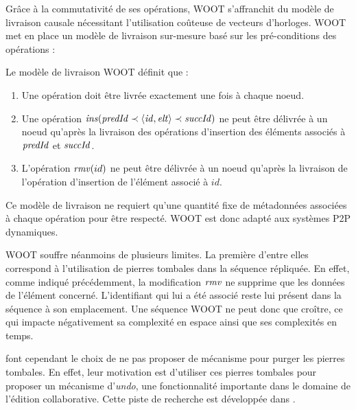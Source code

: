 Grâce à la commutativité de ses opérations, WOOT s'affranchit du modèle de livraison causale nécessitant l'utilisation coûteuse de vecteurs d'horloges.
WOOT met en place un modèle de livraison sur-mesure basé sur les pré-conditions des opérations :
\begin{definition}
  Le modèle de livraison WOOT définit que :
  \begin{enumerate}[label=(\roman*)]
    \item Une opération doit être livrée exactement une fois à chaque noeud\footnotemark.
    \item Une opération $\mathit{ins}(\mathit{predId} \prec \langle \mathit{id},\mathit{elt} \rangle \prec \mathit{succId})$ ne peut être délivrée à un noeud qu'après la livraison des opérations d'insertion des éléments associés à $\mathit{predId}$ et $\mathit{succId}$.
    \item L'opération $\mathit{rmv}(id)$ ne peut être délivrée à un noeud qu'après la livraison de l'opération d'insertion de l'élément associé à $id$.
  \end{enumerate}
\end{definition}
Ce modèle de livraison ne requiert qu'une quantité fixe de métadonnées associées à chaque opération pour être respecté.
WOOT est donc adapté aux systèmes \ac{P2P} dynamiques.

WOOT souffre néanmoins de plusieurs limites.
La première d'entre elles correspond à l'utilisation de pierres tombales dans la séquence répliquée.
En effet, comme indiqué précédemment, la modification $\mathit{rmv}$ ne supprime que les données de l'élément concerné.
L'identifiant qui lui a été associé reste lui présent dans la séquence à son emplacement.
Une séquence WOOT ne peut donc que croître, ce qui impacte négativement sa complexité en espace ainsi que ses complexités en temps.

\textcite{2006-woot-oster} font cependant le choix de ne pas proposer de mécanisme pour purger les pierres tombales.
En effet, leur motivation est d'utiliser ces pierres tombales pour proposer un mécanisme d'\emph{undo}, une fonctionnalité importante dans le domaine de l'édition collaborative.
Cette piste de recherche est développée dans \cite{2009-undo-p2p-semantic-wikis-rahhal}.

